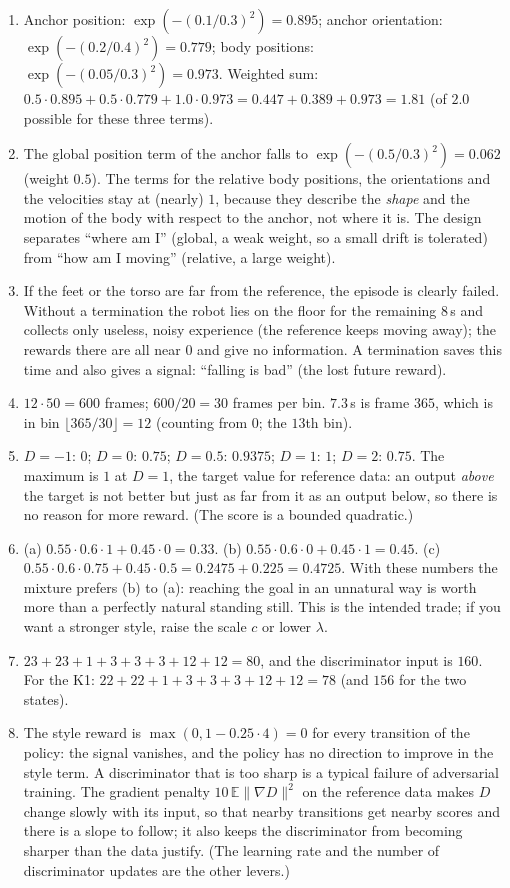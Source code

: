 \begin{enumerate}[label=\textbf{\ansnum.\arabic*}]
  \item Anchor position: $\exp(-(0.1/0.3)^2)=0.895$; anchor orientation: $\exp(-(0.2/0.4)^2)=0.779$; body positions: $\exp(-(0.05/0.3)^2)=0.973$. Weighted sum: $0.5\cdot0.895+0.5\cdot0.779+1.0\cdot0.973=0.447+0.389+0.973=1.81$ (of $2.0$ possible for these three terms).
  \item The global position term of the anchor falls to $\exp(-(0.5/0.3)^2)=0.062$ (weight $0.5$). The terms for the relative body positions, the orientations and the velocities stay at (nearly) $1$, because they describe the \emph{shape} and the motion of the body with respect to the anchor, not where it is. The design separates ``where am I'' (global, a weak weight, so a small drift is tolerated) from ``how am I moving'' (relative, a large weight).
  \item If the feet or the torso are far from the reference, the episode is clearly failed. Without a termination the robot lies on the floor for the remaining $8$\,s and collects only useless, noisy experience (the reference keeps moving away); the rewards there are all near $0$ and give no information. A termination saves this time and also gives a signal: ``falling is bad'' (the lost future reward).
  \item $12\cdot50=600$ frames; $600/20=30$ frames per bin. $7.3$\,s is frame $365$, which is in bin $\lfloor365/30\rfloor=12$ (counting from $0$; the $13$th bin).
  \item $D=-1$: $0$; $D=0$: $0.75$; $D=0.5$: $0.9375$; $D=1$: $1$; $D=2$: $0.75$. The maximum is $1$ at $D=1$, the target value for reference data: an output \emph{above} the target is not better but just as far from it as an output below, so there is no reason for more reward. (The score is a bounded quadratic.)
  \item (a) $0.55\cdot0.6\cdot1+0.45\cdot0=0.33$. (b) $0.55\cdot0.6\cdot0+0.45\cdot1=0.45$. (c) $0.55\cdot0.6\cdot0.75+0.45\cdot0.5=0.2475+0.225=0.4725$. With these numbers the mixture prefers (b) to (a): reaching the goal in an unnatural way is worth more than a perfectly natural standing still. This is the intended trade; if you want a stronger style, raise the scale $c$ or lower $\lambda$.
  \item $23+23+1+3+3+3+12+12=80$, and the discriminator input is $160$. For the K1: $22+22+1+3+3+3+12+12=78$ (and $156$ for the two states).
  \item The style reward is $\max(0,1-0.25\cdot4)=0$ for every transition of the policy: the signal vanishes, and the policy has no direction to improve in the style term. A discriminator that is too sharp is a typical failure of adversarial training. The gradient penalty $10\,\mathbb E\|\nabla D\|^2$ on the reference data makes $D$ change slowly with its input, so that nearby transitions get nearby scores and there is a slope to follow; it also keeps the discriminator from becoming sharper than the data justify. (The learning rate and the number of discriminator updates are the other levers.)

\end{enumerate}
